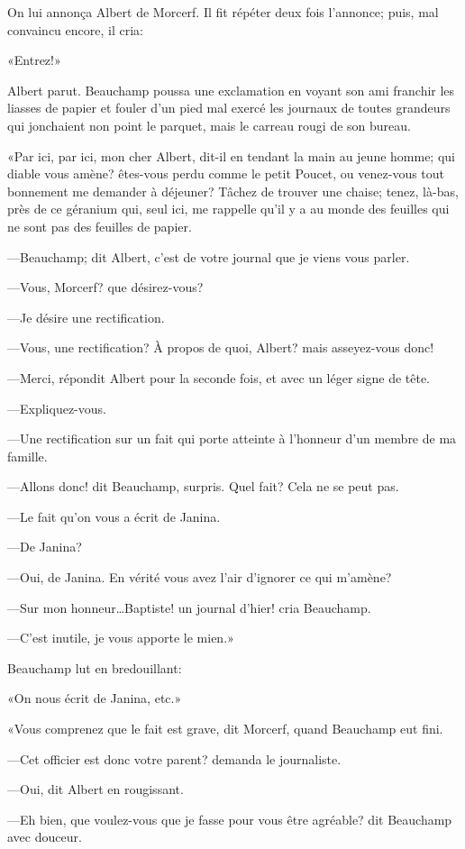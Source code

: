 On lui annonça Albert de Morcerf. Il fit répéter deux fois l'annonce; puis, mal convaincu encore, il cria: 

«Entrez!» 

Albert parut. Beauchamp poussa une exclamation en voyant son ami franchir les liasses de papier et fouler d'un pied mal exercé les journaux de toutes grandeurs qui jonchaient non point le parquet, mais le carreau rougi de son bureau. 

«Par ici, par ici, mon cher Albert, dit-il en tendant la main au jeune homme; qui diable vous amène? êtes-vous perdu comme le petit Poucet, ou venez-vous tout bonnement me demander à déjeuner? Tâchez de trouver une chaise; tenez, là-bas, près de ce géranium qui, seul ici, me rappelle qu'il y a au monde des feuilles qui ne sont pas des feuilles de papier. 

—Beauchamp; dit Albert, c'est de votre journal que je viens vous parler. 

—Vous, Morcerf? que désirez-vous? 

—Je désire une rectification. 

—Vous, une rectification? À propos de quoi, Albert? mais asseyez-vous donc! 

—Merci, répondit Albert pour la seconde fois, et avec un léger signe de tête. 

—Expliquez-vous. 

—Une rectification sur un fait qui porte atteinte à l'honneur d'un membre de ma famille. 

—Allons donc! dit Beauchamp, surpris. Quel fait? Cela ne se peut pas. 

—Le fait qu'on vous a écrit de Janina. 

—De Janina? 

—Oui, de Janina. En vérité vous avez l'air d'ignorer ce qui m'amène? 

—Sur mon honneur\dots Baptiste! un journal d'hier! cria Beauchamp. 

—C'est inutile, je vous apporte le mien.» 

Beauchamp lut en bredouillant: 

«On nous écrit de Janina, etc.» 

«Vous comprenez que le fait est grave, dit Morcerf, quand Beauchamp eut fini. 

—Cet officier est donc votre parent? demanda le journaliste. 

—Oui, dit Albert en rougissant. 

—Eh bien, que voulez-vous que je fasse pour vous être agréable? dit Beauchamp avec douceur. 

